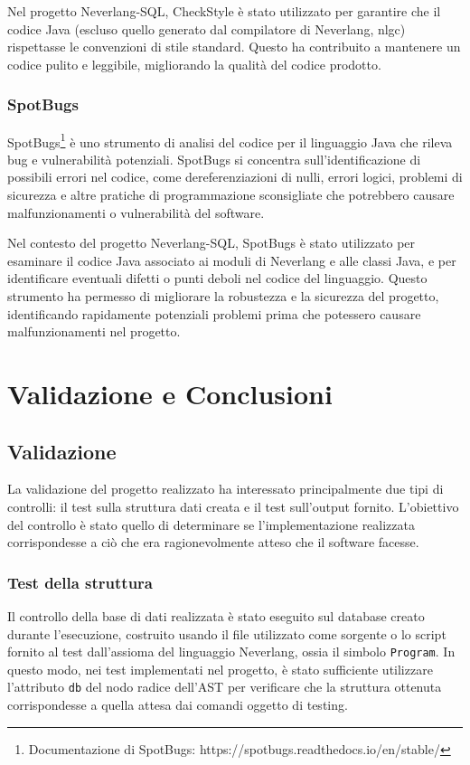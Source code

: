 \documentclass[12pt,a4paper,openright,twoside]{book}
\begin{document}
Nel progetto Neverlang-SQL, CheckStyle è stato utilizzato per garantire che il codice Java (escluso quello generato dal compilatore di 
Neverlang, nlgc) rispettasse le convenzioni di stile standard. Questo ha contribuito a mantenere un codice pulito e leggibile, migliorando 
la qualità del codice prodotto.

\subsection{SpotBugs}
SpotBugs\footnote{Documentazione di SpotBugs: https://spotbugs.readthedocs.io/en/stable/} è uno strumento di analisi del codice per il 
linguaggio Java che rileva bug e vulnerabilità potenziali. SpotBugs si concentra sull’identificazione di possibili errori nel codice, come 
dereferenziazioni di nulli, errori logici, problemi di sicurezza e altre pratiche di programmazione sconsigliate che potrebbero causare 
malfunzionamenti o vulnerabilità del software.

Nel contesto del progetto Neverlang-SQL, SpotBugs è stato utilizzato per esaminare il codice Java associato ai moduli di Neverlang e alle 
classi Java, e per identificare eventuali difetti o punti deboli nel codice del linguaggio. Questo strumento ha permesso di migliorare la 
robustezza e la sicurezza del progetto, identificando rapidamente potenziali problemi prima che potessero causare malfunzionamenti nel 
progetto.

\chapter{Validazione e Conclusioni}
\label{chap:conclusioni}
\section{Validazione}
\label{chap:validazione}
La validazione del progetto realizzato ha interessato principalmente due tipi di controlli: il test sulla struttura dati creata 
e il test sull’output fornito. L’obiettivo del controllo è stato quello di determinare se l’implementazione realizzata 
corrispondesse a ciò che era ragionevolmente atteso che il software facesse.

\subsection{Test della struttura}
\label{section:test-strutt}
Il controllo della base di dati realizzata è stato eseguito sul database creato durante l’esecuzione, costruito usando il file 
utilizzato come sorgente o lo script fornito al test dall’assioma del linguaggio Neverlang, ossia il simbolo \texttt{Program}. In 
questo modo, nei test implementati nel progetto, è stato sufficiente utilizzare l’attributo \texttt{db} del nodo radice dell’AST 
per verificare che la struttura ottenuta corrispondesse a quella attesa dai comandi oggetto di testing.
\end{document}

